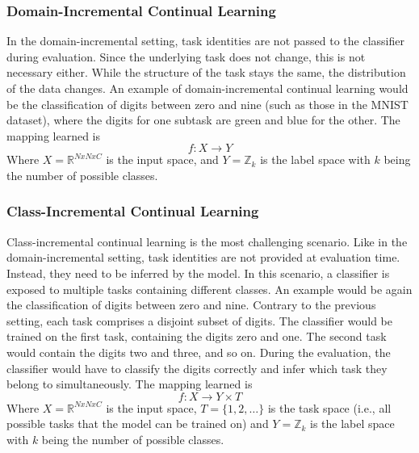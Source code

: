 \subsubsection{Domain-Incremental Continual Learning}
\label{sec:DomainIncrementalContinualLearning}
In the domain-incremental setting, task identities are not passed to the classifier during evaluation. Since the underlying task does not change, this is not necessary either.
While the structure of the task stays the same, the distribution of the data changes. An example of domain-incremental continual learning would be the classification of digits
between zero and nine (such as those in the MNIST \cite{mnist_web} dataset), where the digits for one subtask are green and blue for the other. The mapping learned is
\begin{equation}
    f: X \rightarrow Y
\end{equation}
Where $X = \mathbb{R}^{N x N x C}$ is the input space, and $Y = \mathbb{Z}_{k}$ is the label space with $k$ being the
number of possible classes.

\subsubsection{Class-Incremental Continual Learning}
\label{sec:ClassIncrementalContinualLearning}
Class-incremental continual learning is the most challenging scenario. Like in the domain-incremental setting, task identities are not provided at evaluation time. Instead, they need to
be inferred by the model. In this scenario, a classifier is exposed to multiple tasks containing different classes. An example would be again the classification of digits between zero and nine.
Contrary to the previous setting, each task comprises a disjoint subset of digits. The classifier would be trained on the first task, containing the digits zero and one. The second task
would contain the digits two and three, and so on. During the evaluation, the classifier would have to classify the digits correctly and infer which task they belong to simultaneously. 
The mapping learned is
\begin{equation}
    f: X \rightarrow Y \times T
\end{equation}
Where $X = \mathbb{R}^{N x N x C}$ is the input space, $T = \{1,2,\ldots\}$ is the task space (i.e., all possible
tasks that the model can be trained on) and $Y = \mathbb{Z}_{k}$ is the label space with $k$ being the number of possible classes.

